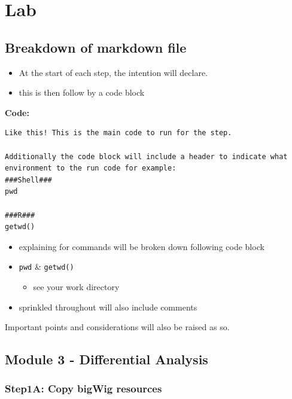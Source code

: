 \documentclass[
]{book}
\providecommand{\tightlist}{%
  \setlength{\itemsep}{0pt}\setlength{\parskip}{0pt}}
\begin{document}
\section{Lab}\label{lab-2}

\subsection{Breakdown of markdown file}\label{breakdown-of-markdown-file-2}

\begin{itemize}
\tightlist
\item
  At the start of each step, the intention will declare.
\item
  this is then follow by a code block
\end{itemize}

\textbf{Code:}

\begin{verbatim}
Like this! This is the main code to run for the step.

Additionally the code block will include a header to indicate what environment to the run code for example:
###Shell###
pwd

###R###
getwd()
\end{verbatim}

\begin{itemize}
\tightlist
\item
  explaining for commands will be broken down following code block
\item
  \texttt{pwd} \& \texttt{getwd()}

  \begin{itemize}
  \tightlist
  \item
    see your work directory
  \end{itemize}
\item
  sprinkled throughout will also include comments
\end{itemize}

Important points and considerations will also be raised as so.

\subsection{Module 3 - Differential Analysis}\label{module-3---differential-analysis}

\subsubsection{Step1A: Copy bigWig resources}\label{step1a-copy-bigwig-resources}
\end{document}
